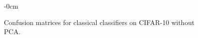 \documentclass[journal,article,submit,pdftex,moreauthors]{Definitions/mdpi}
\begin{document}
\begin{figure}[H]
\begin{adjustwidth}{-\extralength}{0cm}
{}\\[1em]
\end{adjustwidth}
\caption{Confusion matrices for classical classifiers on CIFAR-10 without PCA.\label{fig:confmats_cifar10_sem_pca}}
\end{figure}
\end{document}
